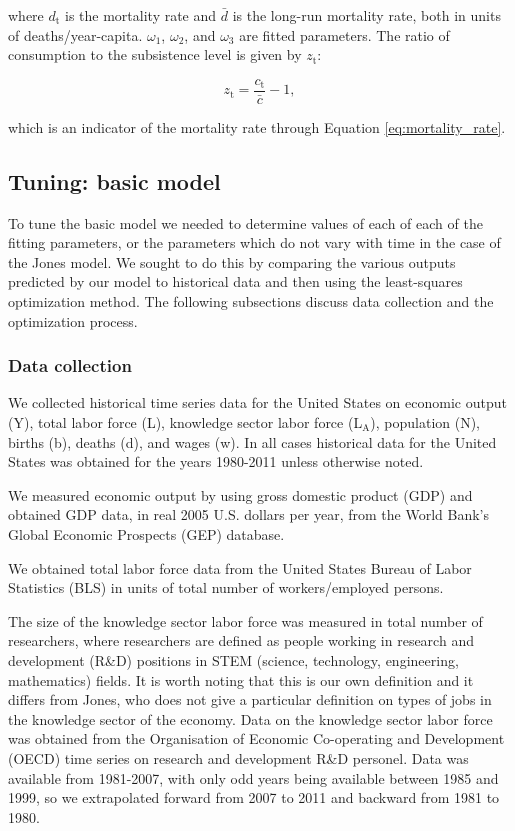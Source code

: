 \documentclass[letterpaper,12pt]{article}
\begin{document}
\noindent where $d_\mathrm{t}$ is the mortality rate and $\bar d$ is the long-run mortality rate, both in units of deaths/year-capita. $\omega_\mathrm{1}$, $\omega_\mathrm{2}$, and $\omega_\mathrm{3}$ are fitted parameters. The ratio of consumption to the subsistence level is given by $z_\mathrm{t}$:

\begin{equation} \label{eq:z}
	z_\mathrm{t} = \frac{c_\mathrm{t}}{\bar c} - 1, 
\end{equation}

\noindent which is an indicator of the mortality rate through Equation \ref{eq:mortality_rate}.

\subsection{Tuning: basic model}
\label{sec:Tuning_basic_model}

To tune the basic model we needed to determine values of each of each of the fitting parameters, or the parameters which do not vary with time in the case of the Jones model. We sought to do this by comparing the various outputs predicted by our model to historical data and then using the least-squares optimization method. The following subsections discuss data collection and the optimization process.

\subsubsection{Data collection}
We collected historical time series data for the United States on economic output (Y), total labor force (L), knowledge sector labor force (L$_\mathrm{A}$), population (N), births (b), deaths (d), and wages (w). In all cases historical data for the United States was obtained for the years 1980-2011 unless otherwise noted. 

We measured economic output by using gross domestic product (GDP) and obtained GDP data, in real 2005 U.S. dollars per year, from the World Bank's Global Economic Prospects (GEP) database. 

We obtained total labor force data from the United States Bureau of Labor Statistics (BLS) in units of total number of workers/employed persons.

The size of the knowledge sector labor force was measured in total number of researchers, where researchers are defined as people working in research and development (R\&D) positions in STEM (science, technology, engineering, mathematics) fields. It is worth noting that this is our own definition and it differs from Jones, who does not give a particular definition on types of jobs in the knowledge sector of the economy. Data on the knowledge sector labor force was obtained from the Organisation of Economic Co-operating and Development (OECD) time series on research and development R\&D personel. Data was available from 1981-2007, with only odd years being available between 1985 and 1999, so we extrapolated forward from 2007 to 2011 and backward from 1981 to 1980.
\end{document}
